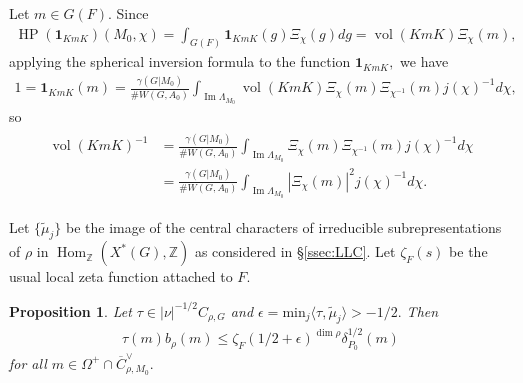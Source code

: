 \documentclass[10pt]{amsart}
\newtheorem{proposition}[theorem]{Proposition}
\theoremstyle{definition}
\numberwithin{equation}{section}
\DeclareMathOperator{\vol}{\mathrm{vol}}
\DeclareMathOperator{\Hom}{\mathrm{Hom}}
\numberwithin{equation}{subsection}
\newcommand{\ZZ}{\mathbb{Z}}
\renewcommand{\Im}{\mathop{\mathrm{Im}}}
\newcommand{\HP}{\mathop{\mathrm{HP}}\nolimits}
\begin{document}
Let $m\in G(F)$. Since
\begin{align*}
    \HP(\mathbf{1}_{KmK})(M_0,\chi) = \int_{G(F)} \mathbf{1}_{KmK}(g)\Xi_\chi(g) dg = \vol(KmK) \Xi_\chi(m),
\end{align*}
applying the spherical inversion formula to the function $\mathbf{1}_{KmK},$ we have
\begin{align*}
    1 = \mathbf{1}_{KmK}(m) = \frac{\gamma(G|M_0)}{\# W(G,A_0)}\int_{\Im\Lambda_{M_0}} \vol(KmK) \Xi_\chi(m)\Xi_{\chi^{-1}}(m)j(\chi)^{-1} d\chi,
\end{align*}
so 
\begin{align}
\begin{split}\label{spherical:KmK}
    \vol(KmK)^{-1} &= \frac{\gamma(G|M_0)}{\# W(G,A_0)}\int_{\Im\Lambda_{M_0}} \Xi_\chi(m)\Xi_{\chi^{-1}}(m)j(\chi)^{-1} d\chi\\
    &=\frac{\gamma(G|M_0)}{\# W(G,A_0)}\int_{\Im\Lambda_{M_0}} |\Xi_\chi(m)|^2j(\chi)^{-1} d\chi.
\end{split}
\end{align}


Let $\{\widetilde{\mu}_j\}$ be the image of the central characters of irreducible subrepresentations of $\rho$ in $\Hom_\ZZ(X^\ast(G),\ZZ)$ as considered in \S\ref{ssec:LLC}. Let $\zeta_F(s)$ be the usual local zeta function attached to $F$.

\begin{proposition} Let $\tau\in |\nu|^{-1/2}C_{\rho,G}$ and $\epsilon=\mathrm{min}_j \langle \tau, \widetilde{\mu}_j\rangle>-1/2.$ Then  
\begin{align*}
    \tau(m)b_\rho(m)\le  \zeta_F(1/2+\epsilon)^{\dim \rho}\delta_{P_0}^{1/2}(m)
\end{align*}
for all $m\in \Omega^+\cap \overline{C}_{\rho,M_0}^\lor.$
\end{proposition}
\end{document}
